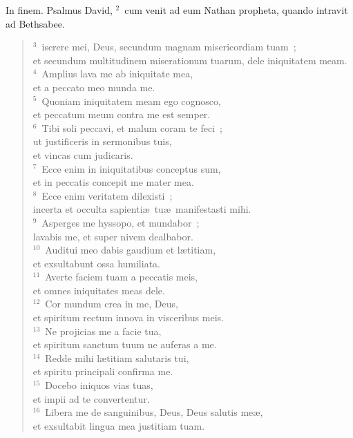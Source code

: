 \bchapter[Psalm]
In finem. Psalmus David,
${}^{2}$~cum venit ad eum Nathan propheta, quando intravit ad Bethsabee.
\begin{verse}${}^{3}$~iserere mei, Deus, secundum magnam misericordiam tuam~;\\ et secundum multitudinem miserationum tuarum, dele iniquitatem meam.\\
${}^{4}$~Amplius lava me ab iniquitate mea,\\ et a peccato meo munda me.\\
${}^{5}$~Quoniam iniquitatem meam ego cognosco,\\ et peccatum meum contra me est semper.\\
${}^{6}$~Tibi soli peccavi, et malum coram te feci~;\\ ut justificeris in sermonibus tuis,\\ et vincas cum judicaris.\\
${}^{7}$~Ecce enim in iniquitatibus conceptus sum,\\ et in peccatis concepit me mater mea.\\
${}^{8}$~Ecce enim veritatem dilexisti~;\\ incerta et occulta sapienti\ae\ tu\ae\ manifestasti mihi.\\
${}^{9}$~Asperges me hyssopo, et mundabor~;\\ lavabis me, et super nivem dealbabor.\\
${}^{10}$~Auditui meo dabis gaudium et l\ae titiam,\\ et exsultabunt ossa humiliata.\\
${}^{11}$~Averte faciem tuam a peccatis meis,\\ et omnes iniquitates meas dele.\\
${}^{12}$~Cor mundum crea in me, Deus,\\ et spiritum rectum innova in visceribus meis.\\
${}^{13}$~Ne projicias me a facie tua,\\ et spiritum sanctum tuum ne auferas a me.\\
${}^{14}$~Redde mihi l\ae titiam salutaris tui,\\ et spiritu principali confirma me.\\
${}^{15}$~Docebo iniquos vias tuas,\\ et impii ad te convertentur.\\
${}^{16}$~Libera me de sanguinibus, Deus, Deus salutis me\ae ,\\ et exsultabit lingua mea justitiam tuam.\\

\end{verse}
